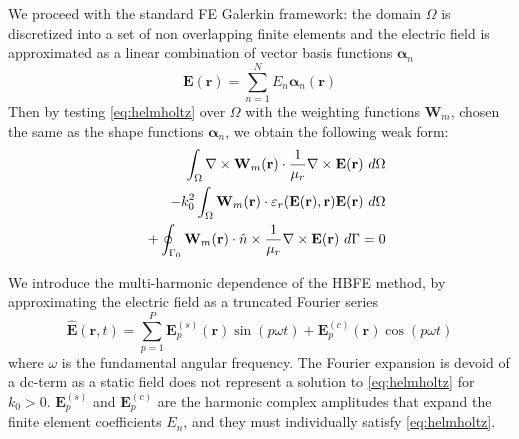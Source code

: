 \documentclass[journal]{IEEEtran}
\renewcommand{\vec}[1]{\mathbf{#1}}
\begin{document}
\par We proceed with the standard FE Galerkin framework: the domain $\Omega$ is discretized into a set of non overlapping finite elements and the electric field is approximated as a linear combination of vector basis functions $\boldsymbol{\alpha}_n$ 
\begin{equation}
\vec{E}(\vec{r})  = \sum_{n=1}^N E_n \boldsymbol{\alpha}_n(\vec{r})
\end{equation} %
Then by testing \eqref{eq:helmholtz} over $\Omega$ with the weighting functions $\vec{W}_m$, chosen the same as the shape functions $\boldsymbol{\alpha}_n$, we obtain the following weak form:
\begin{eqnarray}\label{eq:fem}
& & \hspace{-1.5cm} \int_\Omega \nabla \times \vec{W}_m (\vec{r}) \cdot \frac{1}{\mu_r} \nabla \times \vec{E}(\vec{r}) \ d\Omega \nonumber \\
& & \hspace{-.75cm} - k_0^2 \int_\Omega  \vec{W}_m (\vec{r}) \cdot \varepsilon_r (\vec{E}(\vec{r}), \vec{r}) \vec{E}(\vec{r}) \ d\Omega \nonumber \\
& & + \oint_{\Gamma_0} \vec{W}_m (\vec{r}) \cdot \hat{n} \times \frac{1}{\mu_r} \nabla \times \vec{E}(\vec{r}) \ d\Gamma = 0
\end{eqnarray} 


\par We introduce the multi-harmonic dependence of the HBFE method, by approximating the electric field as a truncated Fourier series \cite{Bachinger2005}
\begin{equation} \label{eq:field}
\vec{\hat{E}}(\vec{r}, t) = \sum^P_{p=1} \vec{E}_{p}^{(s)}(\vec{r}) \sin(p \omega t) + \vec{E}_p^{(c)}(\vec{r}) \cos(p \omega t)
\end{equation} where $\omega$ is the fundamental angular frequency.
The Fourier expansion is devoid of a dc-term as a static field does not represent a solution to \eqref{eq:helmholtz} for $k_0 > 0$. $\vec{E}_{p}^{(s)}$ and $\vec{E}_{p}^{(c)}$ are the harmonic complex amplitudes that expand the finite element coefficients $E_n$, and they must individually satisfy \eqref{eq:helmholtz}.
\end{document}
